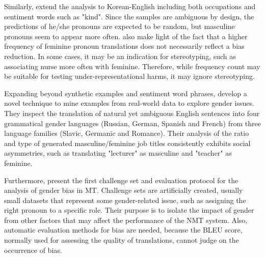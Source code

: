 Similarly, \citet{Cho_2019} extend the analysis to Korean-English including both occupations and sentiment words such as "kind". Since the samples are ambiguous by design, the predictions of he/she pronouns are expected to be random, but masculine pronouns seem to appear more often. \citet{Cho_2019} also make light of the fact that a higher frequency of feminine pronoun translations does not necessarily reflect a bias reduction. In some cases, it may be an indication for stereotyping, such as associating nurse more often with feminine. Therefore, while frequency count may be suitable for testing under-representational harms, it may ignore stereotyping.

Expanding beyond synthetic examples and sentiment word phrases, \citet{Gonen_2020} develop a novel technique to mine examples from real-world data to explore gender issues. They inspect the translation of natural yet ambiguous English sentences into four grammatical gender languages (Russian, German, Spanish and French) from three language families (Slavic, Germanic and Romance). Their analysis of the ratio and type of generated masculine/feminine job titles consistently exhibits social asymmetries, such as translating "lecturer" as masculine and "teacher" as feminine.

Furthermore, \citet{Stanovsky_2019} present the first challenge set and evaluation protocol for the analysis of gender bias in MT. Challenge sets are artificially created, usually small datasets that represent some gender-related issue, such as assigning the right pronoun to a specific role. Their purpose is to isolate the impact of gender from other factors that may affect the performance of the NMT system. Also, automatic evaluation methods for bias are needed, because the BLEU score, normally used for assessing the quality of translations, cannot judge on the occurrence of bias. 

